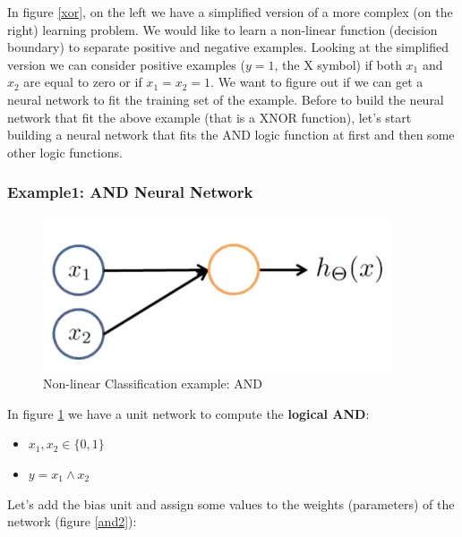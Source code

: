 In figure \ref{xor}, on the left we have a simplified version of a more complex (on the right) learning problem. We would like to learn a non-linear function (decision boundary) to separate positive and negative examples. Looking at the simplified version we can consider positive examples ($y=1$, the X symbol) if both $x_1$ and $x_2$ are equal to zero or if $x_1 = x_2 = 1$. We want to figure out if we can get a neural network to fit the training set of the example. Before to build the neural network that fit the above example (that is a XNOR function), let's start building a neural network that fits the AND logic function at first and then some other logic functions.

\newpage
\begin{mdframed}[style=MyFrame]
\subsubsection{Example1:  AND Neural Network}


\begin{figure}
\begin{center}
\includegraphics[scale=0.25]{images/and1}
\end{center}
\caption{Non-linear Classification example: AND} 
\label{and1}
\end{figure}

In figure \ref{and1} we have a unit network to compute the {\bf logical AND}:
\begin{itemize}
\item $x_1, x_2 \in \{0,1\}$
\item $y = x_1 \land x_2$
\end{itemize}

Let's add the bias unit and assign some values to the weights (parameters) of the network (figure \ref{and2}):


\end{mdframed}
